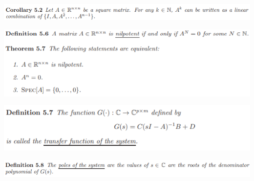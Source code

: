\documentclass[10pt,landscape]{article}
\newenvironment{Figure}
{\par\medskip\noindent\minipage{\linewidth}}
{\endminipage\par\medskip}
\begin{document}
\begin{multicols*}{4}
\begin{Figure}
	\centering
	\includegraphics[width=\linewidth]{pictures/Col5_2.png}
\end{Figure}

\begin{Figure}
	\centering
	\includegraphics[width=\linewidth]{pictures/Th5_7.png}
\end{Figure}

\begin{Figure}
	\centering
	\includegraphics[width=\linewidth]{pictures/Def5_7.png}
\end{Figure}

\begin{Figure}
	\centering
	\includegraphics[width=\linewidth]{pictures/Def5_8.png}
\end{Figure}



\end{multicols*}
\end{document}
